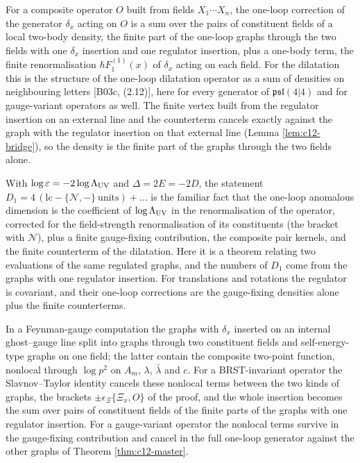 \begin{remark}
For a composite operator $O$ built from fields $X_1\cdots X_n$, the one-loop correction of the generator $\delta_x$ acting on $O$ is a sum over the pairs of constituent fields of a local two-body density, the finite part of the one-loop graphs through the two fields with one $\delta_x$ insertion and one regulator insertion, plus a one-body term, the finite renormalisation $\hbar F_1^{(1)}(x)$ of $\delta_x$ acting on each field. For the dilatation this is the structure of the one-loop dilatation operator as a sum of densities on neighbouring letters [B03c, (2.12)], here for every generator of $\mathfrak{psl}(4|4)$ and for gauge-variant operators as well. The finite vertex built from the regulator insertion on an external line and the counterterm cancels exactly against the graph with the regulator insertion on that external line (Lemma \ref{lem:c12-bridge}), so the density is the finite part of the graphs through the two fields alone.
\end{remark}

\begin{remark}
With $\log\varepsilon=-2\log\Lambda_{\rm UV}$ and $\Delta=2E=-2D$, the statement $D_1=4\,(\mathrm{lc}-\{\mathcal N,-\}\ \text{units})+\dots$ is the familiar fact that the one-loop anomalous dimension is the coefficient of $\log\Lambda_{\rm UV}$ in the renormalisation of the operator, corrected for the field-strength renormalisation of its constituents (the bracket with $\mathcal N$), plus a finite gauge-fixing contribution, the composite pair kernels, and the finite counterterm of the dilatation. Here it is a theorem relating two evaluations of the same regulated graphs, and the numbers of $D_1$ come from the graphs with one regulator insertion. For translations and rotations the regulator is covariant, and their one-loop corrections are the gauge-fixing densities alone plus the finite counterterms.
\end{remark}

\begin{remark}
In a Feynman-gauge computation the graphs with $\delta_x$ inserted on an internal ghost--gauge line split into graphs through two constituent fields and self-energy-type graphs on one field; the latter contain the composite two-point function, nonlocal through $\log p^2$ on $A_m$, $\lambda$, $\bar\lambda$ and $c$. For a BRST-invariant operator the Slavnov--Taylor identity cancels these nonlocal terms between the two kinds of graphs, the brackets $\pm\epsilon_\Xi\{\Xi_x,O\}$ of the proof, and the whole insertion becomes the sum over pairs of constituent fields of the finite parts of the graphs with one regulator insertion. For a gauge-variant operator the nonlocal terms survive in the gauge-fixing contribution and cancel in the full one-loop generator against the other graphs of Theorem \ref{thm:c12-master}.
\end{remark}


